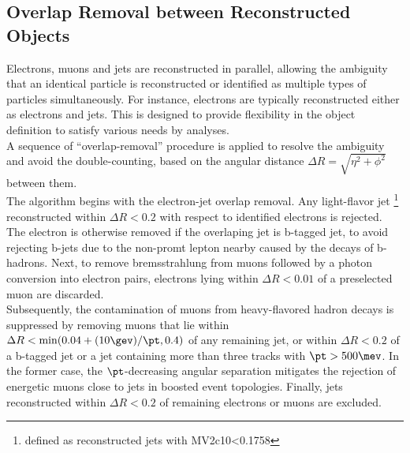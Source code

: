 


\subsection{Overlap Removal between Reconstructed Objects} \label{sec::objDef::OR}
Electrons, muons and jets are reconstructed in parallel, allowing the ambiguity that an identical particle is reconstructed or identified as multiple types of particles simultaneously. 
For instance, electrons are typically reconstructed either as electrons and jets. 
This is designed to provide flexibility in the object definition to satisfy various needs by analyses.  \\

A sequence of ``overlap-removal'' procedure is applied to resolve the ambiguity and avoid the double-counting, based on the angular distance $\Delta R = \sqrt{\eta^2+\phi^2}$ between them.  \\

The algorithm begins with the electron-jet overlap removal.
Any light-flavor jet \footnote{defined as reconstructed jets with MV2c10<0.1758} 
reconstructed within $\Delta R < 0.2$ with respect to identified electrons is rejected.
The electron is otherwise removed if the overlaping jet is b-tagged jet, 
to avoid rejecting b-jets due to the non-promt lepton nearby caused by the decays of b-hadrons. Next, to remove bremsstrahlung from muons followed by a photon conversion into electron pairs, electrons lying within $\Delta R < 0.01$ of a preselected muon are discarded.  \\

Subsequently, the contamination of muons from heavy-flavored hadron decays is suppressed by removing muons that lie within $\Delta R < \min(0.04 + (10 \gev)/\pt, 0.4)$ of any remaining jet, or within $\Delta R < 0.2$ of a b-tagged jet or a jet containing more than three tracks with $\pt > 500 \mev$.
In the former case, the $\pt$-decreasing angular separation mitigates the rejection of energetic muons close to jets in boosted event topologies. Finally, jets reconstructed within $\Delta R < 0.2$ of remaining electrons or muons are excluded. \\

